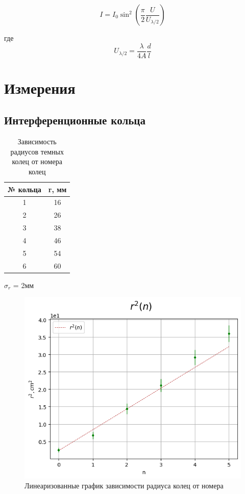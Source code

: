 \documentclass{article}
\begin{document}
\begin{equation}
    I = I_0 \sin^2\left(\frac{\pi}{2}\frac{U}{U_{\lambda/2}}\right)
    \label{eq:pokkels}
\end{equation}

где
\begin{equation}
    U_{\lambda/2} = \frac{\lambda}{4A} \frac{d}{l}
    \label{eq:poluvolnovoe_napryajenie}
\end{equation}

\vspace{1cm}
\section{Измерения}
\subsection{Интерференционные кольца}

\begin{table}[h]
\begin{center}
\begin{tabular}{|c|c|}
\hline
 № кольца &  r, мм \\
\hline
 1 & 16 \\  \hline
 2 & 26 \\ \hline
 3 & 38 \\ \hline
 4 & 46 \\ \hline
 5 & 54 \\ \hline
 6 & 60 \\ \hline


 
\end{tabular}

$\sigma_r$ = 2мм
\caption{Зависимость радиусов темных колец от номера колец}
\end{center}
\end{table}


\begin{figure}[h!]
    \center\includegraphics[width = 0.9\linewidth]{graph.png}
    \caption{Линеаризованные график зависимости радиуса колец от номера}\label{fig:r_m}
\end{figure}
\end{document}
